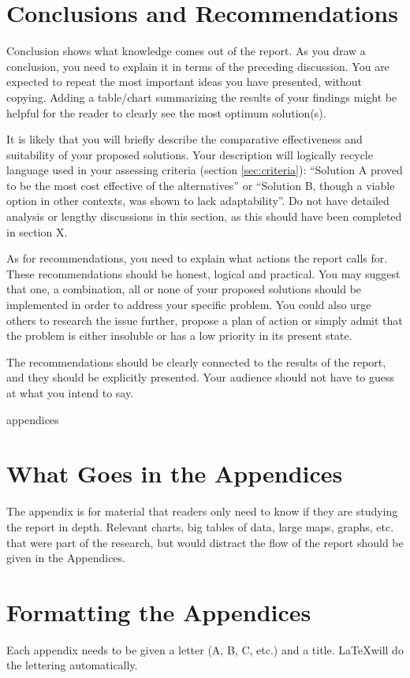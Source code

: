 \documentclass[peerreview]{IEEEtran} %
\begin{document}

\section{Conclusions and Recommendations}
Conclusion shows what knowledge comes out of the report. As you draw a conclusion, you need to explain it in terms of the preceding discussion. You are expected to repeat the most important ideas you have presented, without copying. Adding a table/chart summarizing the results of your findings might be helpful for the reader to clearly see the most optimum solution(s). 

It is likely that you will briefly describe the comparative effectiveness and suitability of your proposed solutions. Your description will logically recycle language used in your assessing criteria (section \ref{sec:criteria}): ``Solution A proved to be the most cost effective of the alternatives'' or ``Solution B, though a viable option in other contexts, was shown to lack adaptability''.  Do not have detailed analysis or lengthy discussions in this section, as this should have been completed in section X. 
 
As for recommendations, you need to explain what actions the report calls for. These recommendations should be honest, logical and practical. You may suggest that one, a combination, all or none of your proposed solutions should be implemented in order to address your specific problem. You could also urge others to research the issue further, propose a plan of action or simply admit that the problem is either insoluble or has a low priority in its present state.   

The recommendations should be clearly connected to the results of the report, and they should be explicitly presented. Your audience should not have to guess at what you intend to say.  




appendices
\section{What Goes in the Appendices} \label{App:WhatGoes}
The appendix is for material that readers only need to know if they are studying the report in depth. Relevant charts,
big tables of data, large maps, graphs, etc. that were part of the research, but would distract the flow of the report should be given in the Appendices.
\section{Formatting the Appendices} \label{App:Formatting}
Each appendix needs to be given a letter (A, B, C, etc.) and a title. \LaTeX will do the lettering automatically.


\printbibliography
\end{document}

